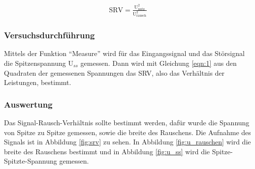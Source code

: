 \documentclass[12pt,a4paper]{article}
\begin{document}
\begin{align}
\text{SRV}=\frac{\text{U}_\text{nutz}^2}{\text{U}_\text{rausch}^2}
\label{eqn:1}
\end{align}


\subsubsection*{Versuchsdurchführung}

Mittels der Funktion "`Measure"' wird für das Eingangssignal und das Störsignal die  Spitzenspannung U$_{ss}$ gemessen. Dann wird mit Gleichung \ref{eqn:1} aus den Quadraten der gemessenen Spannungen das SRV, also das Verhältnis der Leistungen, bestimmt.

\subsubsection*{Auswertung}

Das Signal-Rausch-Verhältnis sollte bestimmt werden, dafür wurde die Spannung von Spitze zu Spitze gemessen, sowie die breite des Rauschens. Die Aufnahme des Signals ist in Abbildung \ref{fig:srv} zu sehen. In Abbildung \ref{fig:u_rauschen} wird die breite des Rauschens bestimmt und in Abbildung \ref{fig:u_ss} wird die Spitze-Spitzte-Spannung gemessen.
\end{document}
